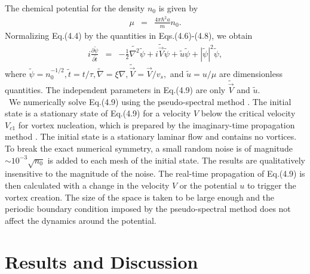 \documentclass[12pt,a4paper]{report} %
\begin{document}
The chemical potential for the density $n_0$ is given by
\begin{eqnarray}
\mu & = & \frac{4 \pi \hbar^2 a}{m} n_0.
\end{eqnarray}
Normalizing Eq.(4.4) by the quantities in Eqs.(4.6)-(4.8), we obtain
\begin{eqnarray}
i \frac{\partial \tilde{\psi}}{\partial \tilde{t}} & = &
- \frac{1}{2} \tilde{\nabla^2} \tilde{\psi}
+ i \tilde{\vec{V}} \tilde{\psi}
+ \tilde{u} \tilde{\psi}
+ | \tilde{\psi} |^2 \tilde{\psi},
\end{eqnarray}
where $\tilde{\psi} = n_0^{-1/2}, \tilde{t} = t/\tau, \tilde{\nabla} = \xi \nabla, \tilde{\vec{V}} = \vec{V}/v_s,$
and $\tilde{u} = u/\mu$ are dimensionless quantities. The independent
parameters in Eq.(4.9) are only $\tilde{\vec{V}}$ and $\tilde{u}$.
\\
\ We numerically solve Eq.(4.9) using the pseudo-spectral method \cite{34}.
The initial state is a stationary state of Eq.(4.9) for a velocity $V$ below the critical velocity $V_{c1}$ for 
vortex nucleation,
which is prepared by the imaginary-time propagation method \cite{55}.
The initial state is a stationary laminar flow and contains no vortices.
To break the exact numerical symmetry,
a small random noise is of magnitude $\sim 10^{-3} \sqrt{n_0}$ is
added to each mesh of the initial state.
The results are qualitatively insensitive to the magnitude of the noise.
The real-time propagation of Eq.(4.9) is
then calculated with a change in the velocity $V$
or the potential $u$ to trigger the 
vortex creation.
The size of the space is taken to be large
enough and the periodic boundary condition imposed by
the pseudo-spectral method does not affect the dynamics
around the potential.
\section{Results and Discussion}
\end{document}
